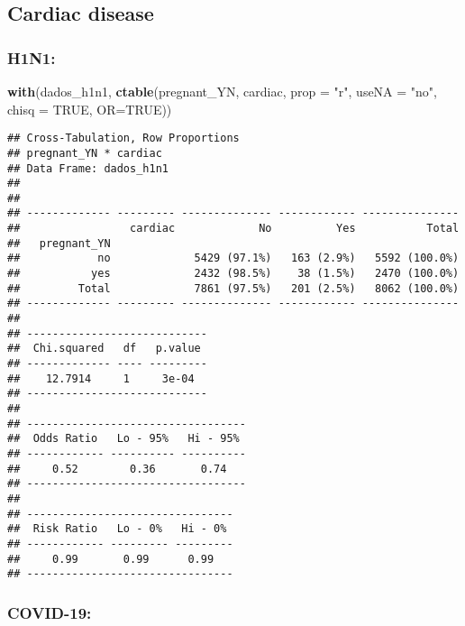 \documentclass[
]{article}
\newenvironment{Shaded}{\begin{snugshade}}{\end{snugshade}}
\newcommand{\DataTypeTok}[1]{\textcolor[rgb]{0.13,0.29,0.53}{#1}}
\newcommand{\KeywordTok}[1]{\textcolor[rgb]{0.13,0.29,0.53}{\textbf{#1}}}
\newcommand{\NormalTok}[1]{#1}
\newcommand{\OtherTok}[1]{\textcolor[rgb]{0.56,0.35,0.01}{#1}}
\newcommand{\StringTok}[1]{\textcolor[rgb]{0.31,0.60,0.02}{#1}}
\begin{document}
\hypertarget{cardiac-disease}{%
\subsection{Cardiac disease}\label{cardiac-disease}}

\hypertarget{h1n1-5}{%
\subsubsection{H1N1:}\label{h1n1-5}}

\begin{Shaded}
\begin{Highlighting}[]
\KeywordTok{with}\NormalTok{(dados_h1n1, }\KeywordTok{ctable}\NormalTok{(pregnant_YN, cardiac, }\DataTypeTok{prop =} \StringTok{"r"}\NormalTok{, }\DataTypeTok{useNA =} \StringTok{"no"}\NormalTok{, }\DataTypeTok{chisq =} \OtherTok{TRUE}\NormalTok{, }\DataTypeTok{OR=}\OtherTok{TRUE}\NormalTok{))}
\end{Highlighting}
\end{Shaded}

\begin{verbatim}
## Cross-Tabulation, Row Proportions  
## pregnant_YN * cardiac  
## Data Frame: dados_h1n1  
## 
## 
## ------------- --------- -------------- ------------ ---------------
##                 cardiac             No          Yes           Total
##   pregnant_YN                                                      
##            no             5429 (97.1%)   163 (2.9%)   5592 (100.0%)
##           yes             2432 (98.5%)    38 (1.5%)   2470 (100.0%)
##         Total             7861 (97.5%)   201 (2.5%)   8062 (100.0%)
## ------------- --------- -------------- ------------ ---------------
## 
## ----------------------------
##  Chi.squared   df   p.value 
## ------------- ---- ---------
##    12.7914     1     3e-04  
## ----------------------------
## 
## ----------------------------------
##  Odds Ratio   Lo - 95%   Hi - 95% 
## ------------ ---------- ----------
##     0.52        0.36       0.74   
## ----------------------------------
## 
## --------------------------------
##  Risk Ratio   Lo - 0%   Hi - 0% 
## ------------ --------- ---------
##     0.99       0.99      0.99   
## --------------------------------
\end{verbatim}

\hypertarget{covid-19-5}{%
\subsubsection{COVID-19:}\label{covid-19-5}}
\end{document}
